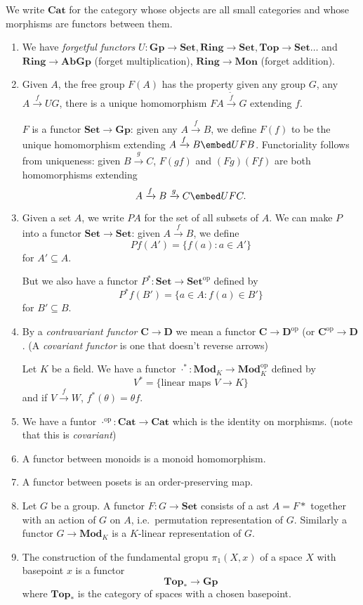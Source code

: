 \documentclass[a4paper]{article}
\renewcommand{\c}[1]{\mathbf{#1}}
\newcommand{\Set}{{\c{Set}}}
\newcommand{\Top}{{\c{Top}}}
\begin{document}
\begin{eg}
  We write \(\c{Cat}\) for the category whose objects are all small categories and whose morphisms are functors between them.
\end{eg}

\begin{eg}\leavevmode
  \begin{enumerate}
  \item We have \emph{forgetful functors} \(U: \c{Gp} \to \Set, \c{Ring} \to \Set, \Top \to \Set \dots\) and \(\c{Ring} \to \c{AbGp}\) (forget multiplication), \(\c{Ring} \to \c{Mon}\) (forget addition).
  \item Given \(A\), the free group \(F(A)\) has the property given any group \(G\), any \(A \xrightarrow{f} U G\), there is a unique homomorphism \(FA \xrightarrow{\tilde f} G\) extending \(f\).

    \(F\) is a functor \(\Set \to \c{Gp}\): given any \(A \xrightarrow{f} B\), we define \(F(f)\) to be the unique homomorphism extending \(A \xrightarrow{f} B \embed U FB\). Functoriality follows from uniqueness: given \(B \xrightarrow{g} C\), \(F(gf)\) and \((Fg)(Ff)\) are both homomorphisms extending
    \[
      A \xrightarrow{f} B \xrightarrow{g} C \embed U F C.
    \]
  \item Given a set \(A\), we write \(PA\) for the set of all subsets of \(A\). We can make \(P\) into a functor \(\Set \to \Set\): given \(A \xrightarrow{f} B\), we define
    \[
      Pf(A') = \{f(a): a \in A'\}
    \]
    for \(A' \subseteq A\).

    But we also have a functor \(P^*: \Set \to \Set^{\text{op}}\) defined by
    \[
      P^*f(B') = \{a \in A: f(a) \in B'\}
    \]
    for \(B' \subseteq B\).
  \item By a \emph{contravariant functor} \(\c C \to \c D\) we mean a functor \(\c C \to \c D^{\text{op}}\) (or \(\c C^{\text{op}} \to \c D\). (A \emph{covariant functor} is one that doesn't reverse arrows)

    Let \(K\) be a field. We have a functor \(\cdot^*: \c{Mod}_K \to \c{Mod}^{\text{op}}_K\) defined by
    \[
      V^* = \{\text{linear maps } V \to K\}
    \]
    and if \(V \xrightarrow{f} W\), \(f^*(\theta) = \theta f\).
  \item We have a funtor \(\cdot^\text{op}: \c{Cat} \to \c{Cat}\) which is the identity on morphisms. (note that this is \emph{covariant})
  \item A functor between monoids is a monoid homomorphism.
  \item A functor between posets is an order-preserving map.
  \item Let \(G\) be a group. A functor \(F: G \to \Set\) consists of a ast \(A = F*\) together with an action of \(G\) on \(A\), i.e.\ permutation representation of \(G\). Similarly a functor \(G \to \c{Mod}_K\) is a \(K\)-linear representation of \(G\).
  \item The construction of the fundamental gropu \(\pi_1(X, x)\) of a space \(X\) with basepoint \(x\) is a functor
    \[
      \Top_* \to \c{Gp}
    \]
    where \(\Top_*\) is the category of spaces with a chosen basepoint.


\end{enumerate}
\end{eg}
\end{document}

